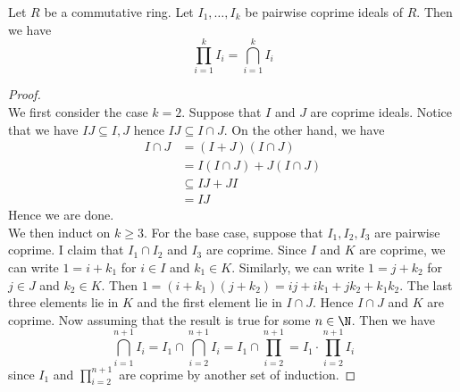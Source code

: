 \documentclass[a4paper]{article}
\begin{document}
\begin{prp}{}{} Let $R$ be a commutative ring. Let $I_1,\dots,I_k$ be pairwise coprime ideals of $R$. Then we have $$\prod_{i=1}^kI_i=\bigcap_{i=1}^kI_i$$ 
\begin{proof}\\
We first consider the case $k=2$. Suppose that $I$ and $J$ are coprime ideals. Notice that we have $IJ\subseteq I,J$ hence $IJ\subseteq I\cap J$. On the other hand, we have 
\begin{align*}
I\cap J&=(I+J)(I\cap J)\tag{$I,J$ are coprime}\\
&=I(I\cap J)+J(I\cap J)\\
&\subseteq IJ+JI\\
&=IJ
\end{align*}
Hence we are done. \\

We then induct on $k\geq 3$. For the base case, suppose that $I_1,I_2,I_3$ are pairwise coprime. I claim that $I_1\cap I_2$ and $I_3$ are coprime. Since $I$ and $K$ are coprime, we can write $1=i+k_1$ for $i\in I$ and $k_1\in K$. Similarly, we can write $1=j+k_2$ for $j\in J$ and $k_2\in K$. Then $1=(i+k_1)(j+k_2)=ij+ik_1+jk_2+k_1k_2$. The last three elements lie in $K$ and the first element lie in $I\cap J$. Hence $I\cap J$ and $K$ are coprime. Now assuming that the result is true for some $n\in\N$. Then we have $$\bigcap_{i=1}^{n+1}I_i=I_1\cap\bigcap_{i=2}^{n+1}I_i=I_1\cap\prod_{i=2}^{n+1}=I_1\cdot\prod_{i=2}^{n+1}I_i$$ since $I_1$ and $\prod_{i=2}^{n+1}$ are coprime by another set of induction. 
\end{proof}
\end{prp}
\end{document}
